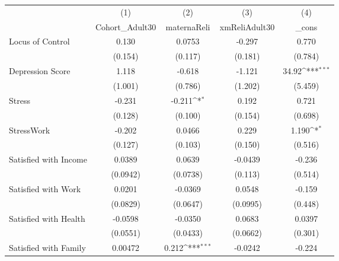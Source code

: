 {
\def\sym#1{\ifmmode^{#1}\else\(^{#1}\)\fi}
\begin{tabular}{l*{4}{c}}
\hline\hline
            &\multicolumn{1}{c}{(1)}&\multicolumn{1}{c}{(2)}&\multicolumn{1}{c}{(3)}&\multicolumn{1}{c}{(4)}\\
            &\multicolumn{1}{c}{Cohort\_Adult30}&\multicolumn{1}{c}{maternaReli}&\multicolumn{1}{c}{xmReliAdult30}&\multicolumn{1}{c}{\_cons}\\
\hline
Locus of Control&       0.130         &      0.0753         &      -0.297         &       0.770         \\
            &     (0.154)         &     (0.117)         &     (0.181)         &     (0.784)         \\
[1em]
Depression Score&       1.118         &      -0.618         &      -1.121         &       34.92\sym{***}\\
            &     (1.001)         &     (0.786)         &     (1.202)         &     (5.459)         \\
[1em]
Stress      &      -0.231         &      -0.211\sym{*}  &       0.192         &       0.721         \\
            &     (0.128)         &     (0.100)         &     (0.154)         &     (0.698)         \\
[1em]
StressWork  &      -0.202         &      0.0466         &       0.229         &       1.190\sym{*}  \\
            &     (0.127)         &     (0.103)         &     (0.150)         &     (0.516)         \\
[1em]
Satisfied with Income&      0.0389         &      0.0639         &     -0.0439         &      -0.236         \\
            &    (0.0942)         &    (0.0738)         &     (0.113)         &     (0.514)         \\
[1em]
Satisfied with Work&      0.0201         &     -0.0369         &      0.0548         &      -0.159         \\
            &    (0.0829)         &    (0.0647)         &    (0.0995)         &     (0.448)         \\
[1em]
Satisfied with Health&     -0.0598         &     -0.0350         &      0.0683         &      0.0397         \\
            &    (0.0551)         &    (0.0433)         &    (0.0662)         &     (0.301)         \\
[1em]
Satisfied with Family&     0.00472         &       0.212\sym{***}&     -0.0242         &      -0.224         \\

\end{tabular}}
